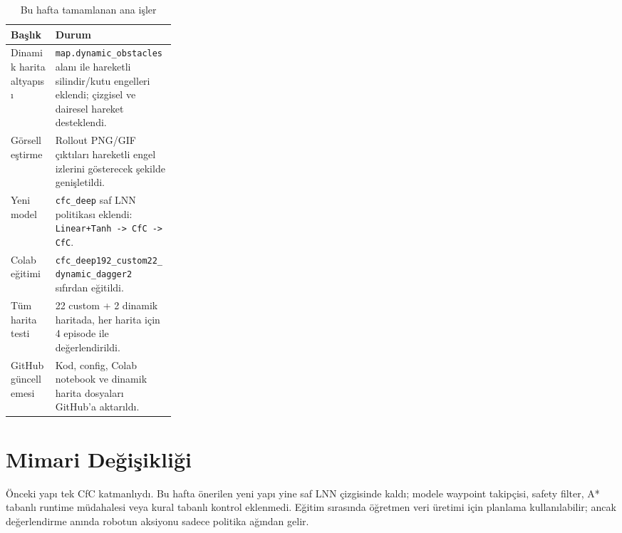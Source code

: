 \documentclass[11pt,a4paper]{article}
\newcommand{\code}[1]{\texttt{#1}}
\begin{document}
\begin{table}[H]
\centering
\caption{Bu hafta tamamlanan ana işler}
\begin{tabularx}{\linewidth}{@{}p{0.27\linewidth}X@{}}
\toprule
\textbf{Başlık} & \textbf{Durum} \\
\midrule
Dinamik harita altyapısı &
\code{map.dynamic\_obstacles} alanı ile hareketli silindir/kutu engelleri
eklendi; çizgisel ve dairesel hareket desteklendi. \\
Görselleştirme &
Rollout PNG/GIF çıktıları hareketli engel izlerini gösterecek şekilde
genişletildi. \\
Yeni model &
\code{cfc\_deep} saf LNN politikası eklendi: \code{Linear+Tanh -> CfC -> CfC}. \\
Colab eğitimi &
\code{cfc\_deep192\_custom22\_dynamic\_dagger2} sıfırdan eğitildi. \\
Tüm harita testi &
22 custom + 2 dinamik haritada, her harita için 4 episode ile değerlendirildi. \\
GitHub güncellemesi &
Kod, config, Colab notebook ve dinamik harita dosyaları GitHub'a aktarıldı. \\
\bottomrule
\end{tabularx}
\end{table}

\section{Mimari Değişikliği}

Önceki yapı tek CfC katmanlıydı. Bu hafta önerilen yeni yapı yine saf LNN
çizgisinde kaldı; modele waypoint takipçisi, safety filter, A* tabanlı runtime
müdahalesi veya kural tabanlı kontrol eklenmedi. Eğitim sırasında öğretmen veri
üretimi için planlama kullanılabilir; ancak değerlendirme anında robotun
aksiyonu sadece politika ağından gelir.
\end{document}
